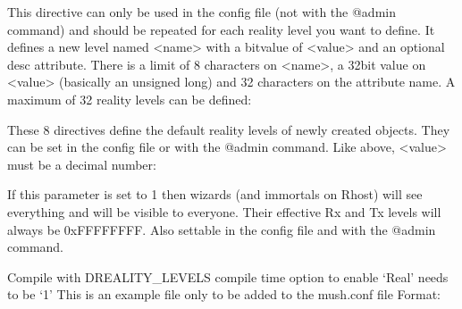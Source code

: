 \documentclass[letterpaper,10pt,english]{sphinxmanual}
\begin{document}
\sphinxAtStartPar
This directive can only be used in the config file (not with the @admin
command) and should be repeated for each reality level you want to define.
It defines a new level named \textless{}name\textgreater{} with a bitvalue of \textless{}value\textgreater{} and an
optional desc attribute. There is a limit of 8 characters on \textless{}name\textgreater{}, a
32\sphinxhyphen{}bit value on \textless{}value\textgreater{} (basically an unsigned long) and 32 characters on
the attribute name. A maximum of 32 reality levels can be defined:

\begin{sphinxVerbatim}[commandchars=\\\{\}]
 
 
 
 
 
 
 
 
\end{sphinxVerbatim}

\sphinxAtStartPar
These 8 directives define the default reality levels of newly created
objects. They can be set in the config file or with the @admin command.
Like above, \textless{}value\textgreater{} must be a decimal number:

\begin{sphinxVerbatim}[commandchars=\\\{\}]
 
\end{sphinxVerbatim}

\sphinxAtStartPar
If this parameter is set to 1 then wizards (and immortals on Rhost) will see
everything and will be visible to everyone. Their effective Rx and Tx levels
will always be 0xFFFFFFFF. Also settable in the config file and with the
@admin command.

\sphinxAtStartPar
Compile with \sphinxhyphen{}DREALITY\_LEVELS compile time option to enable ‘Real’ needs to be ‘1’
This is an example file only to be added to the mush.conf file Format:
\end{document}
